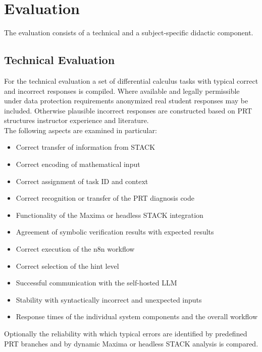 \documentclass[11pt,a4paper,oneside,ngerman]{memoir}
\begin{document}
\section{Evaluation}
The evaluation consists of a technical and a subject-specific didactic component.
\subsection{Technical Evaluation}
For the technical evaluation a set of differential calculus tasks with typical correct and incorrect responses is compiled. Where available and legally permissible under data protection requirements anonymized real student responses may be included. Otherwise plausible incorrect responses are constructed based on PRT structures instructor experience and literature.
\hspace{1 cm}\\
The following aspects are examined in particular:
\begin{itemize}
    \item Correct transfer of information from STACK
    \item Correct encoding of mathematical input
    \item Correct assignment of task ID and context
    \item Correct recognition or transfer of the PRT diagnosis code
    \item Functionality of the Maxima or headless STACK integration
    \item Agreement of symbolic verification results with expected results
    \item Correct execution of the n8n workflow
    \item Correct selection of the hint level
    \item Successful communication with the self-hosted LLM
    \item Stability with syntactically incorrect and unexpected inputs
    \item Response times of the individual system components and the overall workflow
\end{itemize}
Optionally the reliability with which typical errors are identified by predefined PRT branches and by dynamic Maxima or headless STACK analysis is compared.
\end{document}
